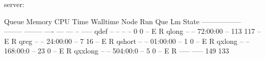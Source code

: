 \begin{prompt}
server: %

Queue      Memory CPU Time Walltime Node  Run Que Lm  State
----------------- -------- -------- ----  --- --- --  -----
qdef         --      --       --      --    0   0 --   E R
qlong        --      --    72:00:00   --  113 117 --   E R
qreg         --      --    24:00:00   --    7  16 --   E R
qshort       --      --    01:00:00   --    1   0 --   E R
qxlong       --      --    168:00:0   --   23   0 --   E R
qxxlong      --      --    504:00:0   --    5   0 --   E R
                                         ----- -----
                                          149  133
\end{prompt}
